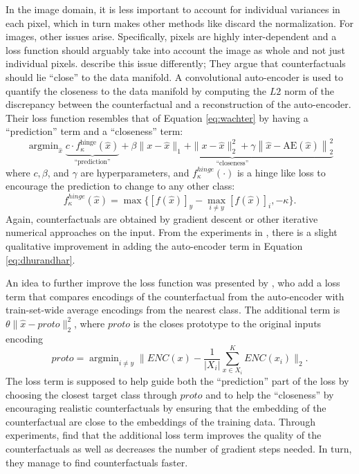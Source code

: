\documentclass[11pt,a4paper,twoside,openright,final]{memoir}
\DeclareMathOperator*{\argmin}{\arg\min}
\begin{document}
In the image domain, it is less important to account for individual variances in each pixel, which in turn makes other methods like \cite{Dhurandhar2018} discard the normalization.
For images, other issues arise.
Specifically, pixels are highly inter-dependent and a loss function should arguably take into account the image as whole and not just individual pixels. 
\citet{Dhurandhar2018} describe this issue differently;
They argue that counterfactuals should lie ``close'' to the data manifold.
A convolutional auto-encoder is used to quantify the closeness to the data manifold by computing the $L2$ norm of the discrepancy between the counterfactual and a reconstruction of the auto-encoder.
Their loss function resembles that of Equation \eqref{eq:wachter} by having a ``prediction'' term and a ``closeness'' term:
\begin{equation}\label{eq:dhurandhar}
    \argmin_{\hat x} 
    \underbrace{ c \cdot f_{\kappa}^{\text{hinge}}\left(\hat x\right)}_{\text{``prediction''}}
    +
    \underbrace{\beta\|x-\hat x\|_1+\|x-\hat x\|_{2}^{2}+\gamma\left\|\hat x-\mathrm{AE}\left(\hat x \right)\right\|_{2}^{2}}_{\text{``closeness''}}
\end{equation}
where $c, \beta$, and $\gamma$ are hyperparameters, and $f_{\kappa}^{hinge} (\cdot)$ is a hinge like loss to encourage the prediction to change to any other class:
\begin{equation}
    f_{\kappa}^{hinge} (\hat x) = \max \{ \left[ f(\hat x)\right]_y - \max_{i\neq y}\left[ f(\hat x) \right]_i, -\kappa \}.
\end{equation}
Again, counterfactuals are obtained by gradient descent or other iterative numerical approaches on the input.
From the experiments in \cite{Dhurandhar2018}, there is a slight qualitative improvement in adding the auto-encoder term in Equation \eqref{eq:dhurandhar}. 

An idea to further improve the loss function was presented by \citet{VanLooveren2019}, who add a loss term that compares encodings of the counterfactual from the auto-encoder with train-set-wide average encodings from the nearest class. 
The additional term is $\theta \| \hat x - proto \|_2^2$, where $proto$ is the closes prototype to the original inputs encoding
\begin{equation}\label{eq:prototype}
    proto = \argmin_{i \neq y} \| ENC(x) - \frac{1}{|X_i|}\sum_{x\in X_i}^K ENC(x_i)\|_2.
\end{equation}
The loss term is supposed to help guide both the ``prediction'' part of the loss by choosing the closest target class through $proto$ and to help the ``closeness'' by encouraging realistic counterfactuals by ensuring that the embedding of the counterfactual are close to the embeddings of the training data.
Through experiments, \citet{VanLooveren2019} find that the additional loss term improves the quality of the counterfactuals as well as decreases the number of gradient steps needed.
In turn, they manage to find counterfactuals faster. 
\end{document}
